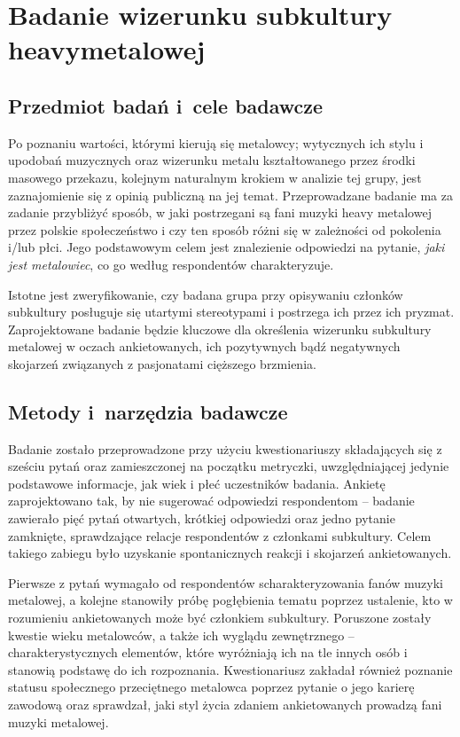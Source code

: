 \documentclass[12pt, a4paper, titlepage]{report}
\begin{document}
\chapter{Badanie wizerunku subkultury heavymetalowej}
\section{Przedmiot badań i~cele badawcze}
Po poznaniu wartości, którymi kierują się metalowcy; wytycznych ich stylu i upodobań muzycznych oraz wizerunku metalu kształtowanego przez środki masowego przekazu, kolejnym naturalnym krokiem w analizie tej grupy, jest zaznajomienie się z opinią publiczną na jej temat. Przeprowadzane badanie ma za zadanie przybliżyć sposób, w jaki postrzegani są fani muzyki heavy metalowej przez polskie społeczeństwo i czy ten sposób różni się w zależności od pokolenia i/lub płci. Jego podstawowym celem jest znalezienie odpowiedzi na pytanie, \emph{jaki jest metalowiec}, co go według respondentów charakteryzuje. 

Istotne jest zweryfikowanie, czy badana grupa przy opisywaniu członków subkultury posługuje się utartymi stereotypami i postrzega ich przez ich pryzmat. Zaprojektowane badanie będzie kluczowe dla określenia wizerunku subkultury metalowej w oczach ankietowanych, ich pozytywnych bądź negatywnych skojarzeń związanych z pasjonatami cięższego brzmienia. 

\section{Metody i~narzędzia badawcze}
Badanie zostało przeprowadzone przy użyciu kwestionariuszy składających się z sześciu pytań oraz zamieszczonej na początku metryczki, uwzględniającej jedynie podstawowe informacje, jak wiek i płeć uczestników badania. Ankietę zaprojektowano tak, by nie sugerować odpowiedzi respondentom -- badanie zawierało pięć pytań otwartych, krótkiej odpowiedzi oraz jedno pytanie zamknięte, sprawdzające relacje respondentów z członkami subkultury. Celem takiego zabiegu było uzyskanie spontanicznych reakcji i skojarzeń ankietowanych. 

Pierwsze z pytań wymagało od respondentów scharakteryzowania fanów muzyki metalowej, a kolejne stanowiły próbę pogłębienia tematu poprzez ustalenie, kto w rozumieniu ankietowanych może być członkiem subkultury. Poruszone zostały kwestie wieku metalowców, a także ich wyglądu zewnętrznego -- charakterystycznych elementów, które wyróżniają ich na tle innych osób i stanowią podstawę do ich rozpoznania. Kwestionariusz zakładał również poznanie statusu społecznego przeciętnego metalowca poprzez pytanie o jego karierę zawodową oraz sprawdzał, jaki styl życia zdaniem ankietowanych prowadzą fani muzyki metalowej.
\end{document}
